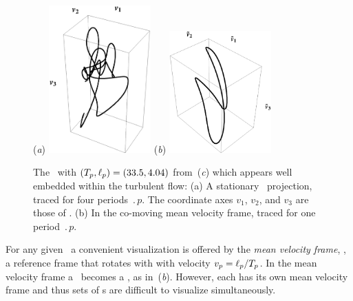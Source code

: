 \begin{figure}[t]
\begin{center}
(\textit{a}) \includegraphics[width=0.35\textwidth]{figs/ks22rpo033.50_04.045E2.eps}
(\textit{b}) \includegraphics[width=0.35\textwidth]{figs/ks22rpo033.50_04.045E2CM.eps}
\\
\end{center}
\caption{
 The
\rpo\ with $({T_{p}},\ell_p) =(33.5,4.04)$
from \,(\textit{c})
which appears well embedded within the turbulent flow:
 (a) A stationary \statesp\ projection,
  traced for four periods $\period{p}$. The coordinate axes
$v_1$, $v_2$, and $v_3$ are those of .
 (b) In the co-moving mean velocity frame,
 traced for one period $\period{p}$.
        } \label{f:MeanVelocityFrame}
\end{figure}

For any given \rpo\ a convenient visualization is
offered by the {\em mean velocity frame}, {\ie},
a reference frame that rotates with with velocity
$v_p=\ell_p/{T_{p}}$.
In the mean velocity frame a \rpo\ becomes
a \po, as in \,(\textit{b}).
However, each {\rpo} has its own mean velocity frame and thus
sets of \rpo s are difficult to visualize simultaneously.

